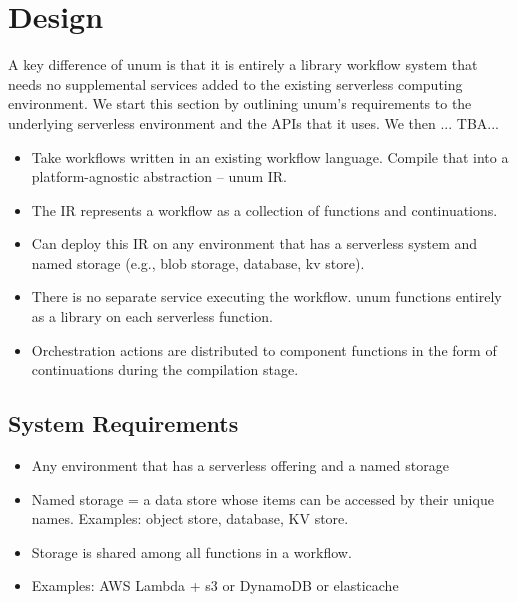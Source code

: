 \section{Design}\label{sec:design}


A key difference of unum is that it is entirely a library workflow system that
needs no supplemental services added to the existing serverless computing
environment. We start this section by outlining unum's requirements to the
underlying serverless environment and the APIs that it uses. We then ... TBA...


\begin{itemize}
	\item Take workflows written in an existing workflow language. Compile
	that into a platform-agnostic abstraction -- unum IR.

	\item The IR represents a workflow as a collection of functions and
	continuations.

	\item Can deploy this IR on any environment that has a serverless system
	and named storage (e.g., blob storage, database, kv store).

	\item There is no separate service executing the workflow. unum functions
	entirely as a library on each serverless function.

	\item Orchestration actions are distributed to component functions in the
	form of continuations during the compilation stage.

\end{itemize}



\subsection{System Requirements}

\begin{itemize}
	\item Any environment that has a serverless offering and a named storage
	\item Named storage = a data store whose items can be accessed by their
	unique names. Examples: object store, database, KV store.
	\item Storage is shared among all functions in a workflow.
	\item Examples: AWS Lambda + s3 or DynamoDB or elasticache
\end{itemize} 



